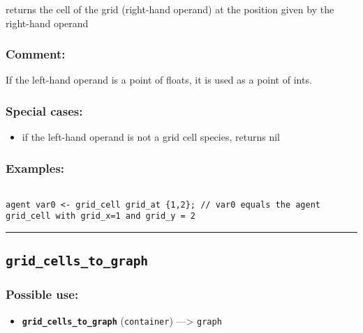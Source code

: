 \documentclass[]{book}
\providecommand{\tightlist}{%
  \setlength{\itemsep}{0pt}\setlength{\parskip}{0pt}}
\theoremstyle{definition}
\theoremstyle{definition}
\theoremstyle{definition}
\theoremstyle{remark}
\begin{document}
returns the cell of the grid (right-hand operand) at the position given
by the right-hand operand

\subsubsection{Comment:}\label{comment-45}

If the left-hand operand is a point of floats, it is used as a point of
ints.

\subsubsection{Special cases:}\label{special-cases-73}

\begin{itemize}
\tightlist
\item
  if the left-hand operand is not a grid cell species, returns nil
\end{itemize}

\subsubsection{Examples:}\label{examples-182}

\begin{verbatim}
 
agent var0 <- grid_cell grid_at {1,2}; // var0 equals the agent grid_cell with grid_x=1 and grid_y = 2
\end{verbatim}

\begin{center}\rule{0.5\linewidth}{\linethickness}\end{center}

\subsection{\texorpdfstring{\texttt{grid\_cells\_to\_graph}}{grid\_cells\_to\_graph}}\label{grid_cells_to_graph}

\subsubsection{Possible use:}\label{possible-use-242}

\begin{itemize}
\tightlist
\item
  \textbf{\texttt{grid\_cells\_to\_graph}} (\texttt{container})
  ---\textgreater{} \texttt{graph}
\end{itemize}
\end{document}
